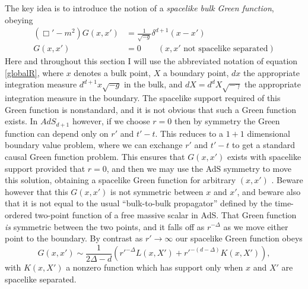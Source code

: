 \documentclass[toc]{PoS}
\newcommand{\be}{\begin{equation}}
\newcommand{\ee}{\end{equation}}
\begin{document}
The key idea is to introduce the notion of a \textit{spacelike bulk Green function}, obeying
\begin{align}\label{spG}
(\Box'-m^2)G(x,x')&=\frac{1}{\sqrt{-g}}\delta^{d+1}(x-x')\\
G(x,x')&=0 \qquad (x,x' \mathrm{\,\,not \,\,spacelike\,\,separated})
\end{align}
Here and throughout this section I will use the abbreviated notation of equation \eqref{globalR}, where $x$ denotes a bulk point, $X$ a boundary point, $dx$ the appropriate integration measure $d^{d+1} x \sqrt{-g}$ in the bulk, and $dX=d^{d}X\sqrt{-\gamma}$ the appropriate integration measure in the boundary.  The spacelike support required of this Green function is nonstandard, and it is not obvious that such a Green function exists.  In $AdS_{d+1}$ however, if we choose $r=0$ then by symmetry the Green function can depend only on $r'$ and $t'-t$.  This reduces to a $1+1$ dimensional boundary value problem, where we can exchange $r'$ and $t'-t$ to get a standard causal Green function problem.  This ensures that $G(x,x')$ exists with spacelike support provided that $r=0$, and then we may use the AdS symmetry to move this solution, obtaining a spacelike Green function for arbitrary $(x,x')$ \cite{Heemskerk:2012mn}.  Beware however that this $G(x,x')$ is not symmetric between $x$ and $x'$, and beware also that it is not equal to the usual ``bulk-to-bulk propagator'' defined by the time-ordered two-point function of a free massive scalar in AdS. That Green function \textit{is} symmetric between the two points, and it falls off as $r^{-\Delta}$ as we move either point to the boundary.  By contrast as $r'\to\infty$ our spacelike Green function obeys
\be\label{Gasymp}
G(x,x')\sim \frac{1}{2\Delta-d}\left(r'^{-\Delta} L(x,X')+r'^{-(d-\Delta)}K(x,X')\right),
\ee
with $K(x,X')$ a nonzero function which has support only when $x$ and $X'$ are spacelike separated.
\end{document}

